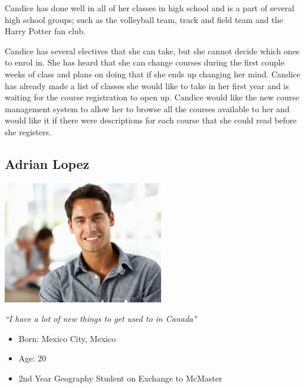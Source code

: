 \documentclass[10pt]{article}
\begin{document}
Candice has done well in all of her classes in high school and is a part of several high school groups; such as the volleyball team, track and field team and the Harry Potter fan club.

Candice has several electives that she can take, but she cannot decide which ones to enrol in. She has heard that she can change courses during the first couple weeks of class and plans on doing that if she ends up changing her mind. Candice has already made a list of classes she would like to take in her first year and is waiting for the course registration to open up. Candice would like the new course management system to allow her to browse all the courses available to her and would like it if there were descriptions for each course that she could read before she registers.


\subsection*{Adrian Lopez}

\begin{minipage}{70mm}
\includegraphics[width=70mm]{Adrian.png}
\begin{center}
\emph{``I have a lot of new things to get used to in Canada"}
\end{center}
\end{minipage}\hfill
\begin{minipage}{\textwidth}
\begin{itemize}
\item Born: Mexico City, Mexico
\item Age: 20
\item 2nd Year Geography Student on Exchange to McMaster
\end{itemize}
\end{minipage}\\
\end{document}
